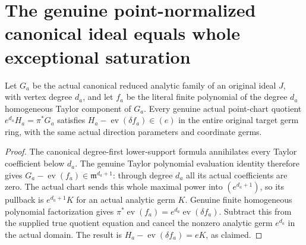 \section{The genuine point-normalized canonical ideal equals whole exceptional saturation}

\begin{lemma}
\label{hir:actual-original-canonical-point-initial-polynomial-congruence}
\leanok
Let $G_a$ be the actual canonical reduced analytic family of an original
ideal $J$, with vertex degree $d_a$, and let $f_a$ be the literal finite
polynomial of the degree $d_a$ homogeneous Taylor component of $G_a$.
Every genuine actual point-chart quotient $e^{d_a}H_a=\pi^*G_a$ satisfies
$H_a-\operatorname{ev}(\delta f_a)\in(e)$ in the entire original target
germ ring, with the same actual direction parameters and coordinate germs.
\end{lemma}
\begin{proof}
The canonical degree-first lower-support formula annihilates every Taylor
coefficient below $d_a$. The genuine Taylor polynomial evaluation identity
therefore gives
$G_a-\operatorname{ev}(f_a)\in\mathfrak m^{d_a+1}$: through degree
$d_a$ all its actual coefficients are zero. The actual chart sends this
whole maximal power into $(e^{d_a+1})$, so its pullback is
$e^{d_a+1}K$ for an actual analytic germ $K$. Genuine finite homogeneous
polynomial factorization gives
$\pi^*\operatorname{ev}(f_a)=e^{d_a}\operatorname{ev}(\delta f_a)$.
Subtract this from the supplied true quotient equation and cancel the
nonzero analytic germ $e^{d_a}$ in the actual domain. The result is
$H_a-\operatorname{ev}(\delta f_a)=eK$, as claimed.
\end{proof}

